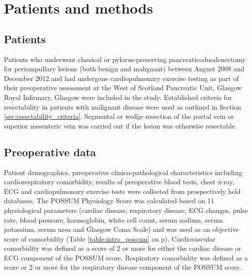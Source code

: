 \clearpage

\section{Patients and methods}

\subsection{Patients}
Patients who underwent classical or pylorus-preserving pancreaticoduodenectomy for periampullary lesions (both benign and malignant) between August 2008 and December 2012 and had undergone cardiopulmonary exercise testing as part of their preoperative assessment at the West of Scotland Pancreatic Unit, Glasgow Royal Infirmary, Glasgow were included in the study. 
Established criteria for resectability in patients with malignant disease were used as outlined in Section \ref{sec:resectability_criteria}. 
Segmental or wedge resection of the portal vein or superior mesenteric vein was carried out if the lesion was otherwise resectable.

\subsection{Preoperative data}
Patient demographics, preoperative clinico-pathological characteristics including cardiorespiratory comorbidity, results of preoperative blood tests, chest x-ray, ECG and cardiopulmonary exercise tests were collected from prospectively held databases. 
The POSSUM Physiology Score was calculated based on 11 physiological parameters (cardiac disease, respiratory disease, ECG changes, pulse rate, blood pressure, haemoglobin, white cell count, serum sodium, serum potassium, serum urea and Glasgow Coma Scale) and was used as an objective score of comorbidity (Table \ref{table:intro_possum} on p\pageref{table:intro_possum}).
Cardiovascular comorbidity was defined as a score of 2 or more for either the cardiac disease or ECG component of the POSSUM score. 
Respiratory comorbidity was defined as a score or 2 or more for the respiratory disease component of the POSSUM score. 

